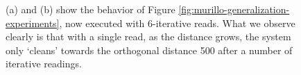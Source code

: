 \begin{figure}[h!]
  \centering


  \caption{(a) and (b) show the behavior of Figure \ref{fig:murillo-generalization-experiments}, now executed with 6-iterative reads. What we observe clearly is that with a single read, as the distance grows, the system only `cleans' towards the orthogonal distance 500 after a number of iterative readings.}
  \label{fig:murillo-generalization-experiments-6reads}
\end{figure}


%

